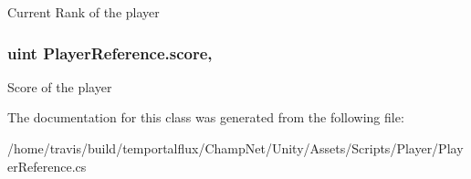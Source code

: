 Current Rank of the player 

\hypertarget{class_player_reference_ae0a1650c4dcd10b54eecdc1eca0edfb9}{
\subsubsection[{score}]{\setlength{\rightskip}{0pt plus 5cm}uint Player\-Reference.\-score\hspace{0.3cm}{\ttfamily [get]}, {\ttfamily [set]}}}\label{class_player_reference_ae0a1650c4dcd10b54eecdc1eca0edfb9}


Score of the player 



The documentation for this class was generated from the following file\-:\begin{DoxyCompactItemize}
\item 
/home/travis/build/temportalflux/\-Champ\-Net/\-Unity/\-Assets/\-Scripts/\-Player/Player\-Reference.\-cs\end{DoxyCompactItemize}
